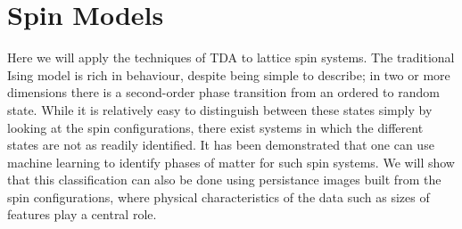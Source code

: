 \documentclass[11pt]{article}
\begin{document}
\section{Spin Models}
Here we will apply the techniques of TDA to lattice spin systems. The traditional Ising model is rich in behaviour, despite being simple to describe; in two or more dimensions there is a second-order phase transition from an ordered to random state. While it is relatively easy to distinguish between these states simply by looking at the spin configurations, there exist systems in which the different states are not as readily identified. It has been demonstrated that one can use machine learning to identify phases of matter for such spin systems. We will show that this classification can also be done using persistance images built from the spin configurations, where physical characteristics of the data such as sizes of features play a central role.
\end{document}
